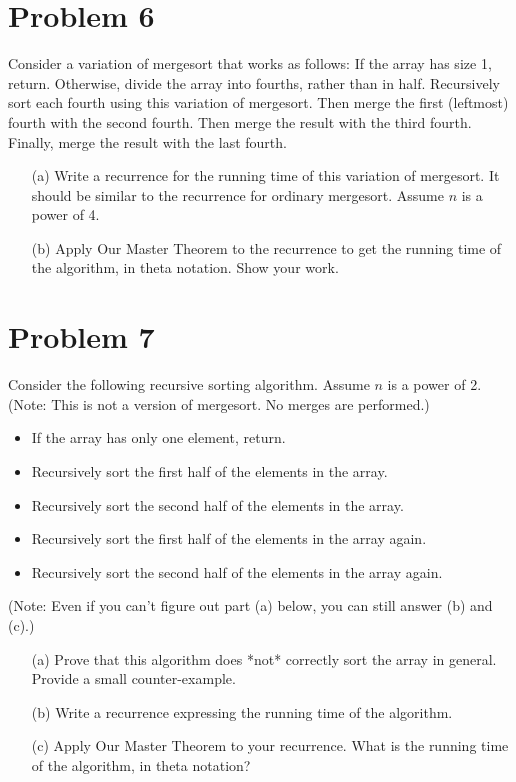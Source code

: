 \documentclass{article}
\begin{document}
\section*{Problem 6}
Consider a variation of mergesort that works as follows: If the array has size 1, return. Otherwise, divide the array into fourths, rather than in half. Recursively sort each fourth using this variation of mergesort. Then merge the first (leftmost) fourth with the second fourth. Then merge the result with the third fourth. Finally, merge the result with the last fourth.

\begin{enumerate}
    \item[(a)] Write a recurrence for the running time of this variation of mergesort. It should be similar to the recurrence for ordinary mergesort. Assume $n$ is a power of 4.
    \item[(b)] Apply Our Master Theorem to the recurrence to get the running time of the algorithm, in theta notation. Show your work.
\end{enumerate}

\section*{Problem 7}
Consider the following recursive sorting algorithm. Assume $n$ is a power of 2. (Note: This is not a version of mergesort. No merges are performed.)

\begin{itemize}
    \item If the array has only one element, return.
    \item Recursively sort the first half of the elements in the array.
    \item Recursively sort the second half of the elements in the array.
    \item Recursively sort the first half of the elements in the array again.
    \item Recursively sort the second half of the elements in the array again.
\end{itemize}
(Note: Even if you can’t figure out part (a) below, you can still answer (b) and (c).)

\begin{enumerate}
    \item[(a)]  Prove that this algorithm does *not* correctly sort the array in general.  Provide a small counter-example.
    \item[(b)] Write a recurrence expressing the running time of the algorithm.
    \item[(c)] Apply Our Master Theorem to your recurrence. What is the running time of the algorithm, in theta notation?
\end{enumerate}
\end{document}
